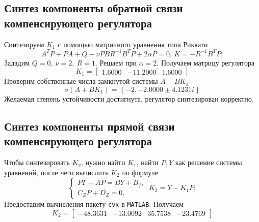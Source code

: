 \documentclass[a4paper, 12pt]{article}
\begin{document}
    \subsection{Синтез компоненты обратной связи компенсирующего регулятора}
    Синтезируем $K_1$ с помощью матричного уравнения типа Риккати
    $$
    A^TP+PA+Q-\nu PBR^{-1}B^TP+2\alpha P=0,\,K=-R^{-1}B^TP;
    $$
    Зададим
    $Q=0,\ \nu=2,\ R=1$. Решаем при $\alpha=2$. Получаем матрицу регулятора
    $$
    K_1=\begin{bmatrix}
    1.6000  &-11.2000    &1.6000
    \end{bmatrix}
    $$
    Проверим собственные числа замкнутой системы $A+BK_1$
    $$
    \sigma\left( A+BK_1 \right)=\left\{ -2,-2.0000 \pm 4.1231i \right\}
    $$
    Желаемая степень устойчивости достигнута, регулятор синтезирован корректно.


    \subsection{Синтез компоненты прямой связи компенсирующего регулятора}
    Чтобы синтезировать $K_2$, нужно найти $K_1$, найти $P,Y$
    как решение системы уравнений, после чего вычислить $K_2$ по формуле
    $$
    \begin{cases}
        P\Gamma-AP=BY+B_f,\\
        C_ZP+D_Z=0,
    \end{cases}\ K_2=Y-K_1P;
    $$
    Предоставим вычисления пакету \texttt{cvx} в \texttt{MATLAB}. Получаем
    $$
    K_2=\begin{bmatrix}
        -48.3631  &-13.0092   &35.7538  &-23.4769
    \end{bmatrix}
    $$


\end{document}

